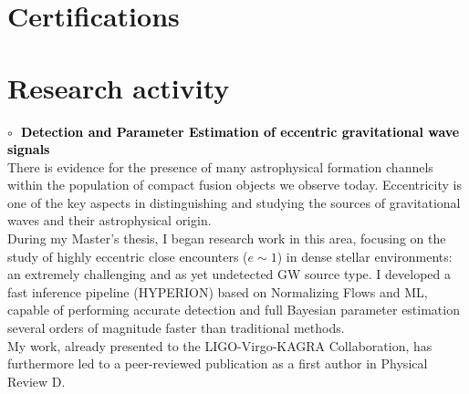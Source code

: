 \section{Certifications}
\vspace{0.2cm}
\vspace{0.2cm}








%

\pagebreak
\section{Research activity}
\textbf{\textcolor{black}{\hspace{0.4cm}$\circ\;$ Detection and Parameter Estimation of eccentric gravitational wave signals}}\vspace{0.05cm}\\
\indent There is evidence for the presence of many astrophysical formation channels within the
population of compact fusion objects we observe today.
Eccentricity is one of the key aspects in distinguishing and studying the sources of
gravitational waves and their astrophysical origin.\\
During my Master's thesis, I began research work in this area, focusing on the study of highly
eccentric close encounters ($e\sim1$) in dense stellar environments: an extremely challenging and
as yet undetected GW source type.
I developed a fast inference pipeline (\textsc{HYPERION}) based on Normalizing Flows and ML,
capable of performing accurate detection and full Bayesian parameter estimation several
orders of magnitude faster than traditional methods.\\
My work, already presented to the LIGO-Virgo-KAGRA Collaboration, has furthermore led to a
peer-reviewed publication as a first author in Physical Review D.
\medskip

